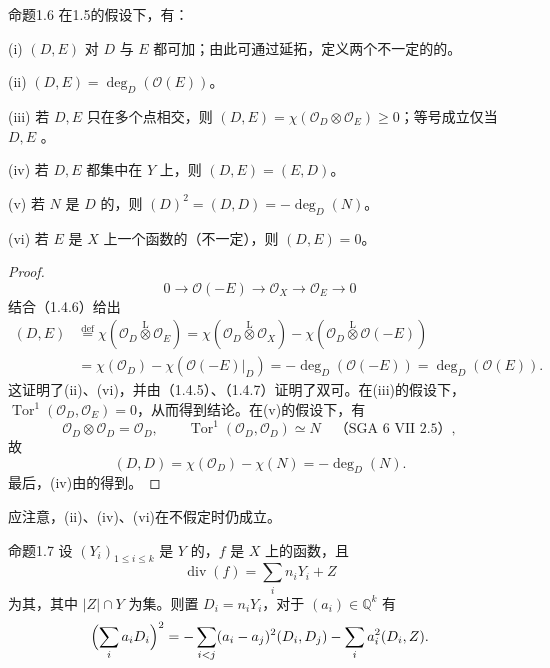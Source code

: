 \begin{SGAresult}{命题}{1.6}
在1.5的假设下，有：

(i)  $(D,E)$ 对 $D$ 与 $E$ 都可加；由此可通过延拓，定义两个不一定的的。

(ii) $(D,E)=\deg_D(\mathcal O(E))$。

(iii) 若 $D,E$ 只在多个点相交，则 $(D,E)=\chi(\mathcal O_D\otimes\mathcal O_E)\geq0$；等号成立仅当 $D,E$ 。

(iv) 若 $D,E$ 都集中在 $Y$ 上，则 $(D,E)=(E,D)$。

(v) 若 $N$ 是 $D$ 的，则 $(D)^2=(D,D)=-\deg_D(N)$。

(vi) 若 $E$ 是 $X$ 上一个函数的（不一定），则 $(D,E)=0$。
\end{SGAresult}
\begin{proof}
\[
0\longrightarrow\mathcal O(-E)\longrightarrow\mathcal O_X\longrightarrow\mathcal O_E\longrightarrow0
\]
结合（1.4.6）给出
\begin{align*}
(D,E)&\overset{\mathrm{def}}=\chi(\mathcal O_D\mathbin{\overset{\mathrm L}{\otimes}}\mathcal O_E)
=\chi(\mathcal O_D\mathbin{\overset{\mathrm L}{\otimes}}\mathcal O_X)-\chi(\mathcal O_D\mathbin{\overset{\mathrm L}{\otimes}}\mathcal O(-E))\\
&=\chi(\mathcal O_D)-\chi(\mathcal O(-E)|_D)
=-\deg_D(\mathcal O(-E))=\deg_D(\mathcal O(E)).
\end{align*}
这证明了(ii)、(vi)，并由（1.4.5）、（1.4.7）证明了双可。在(iii)的假设下，$\operatorname{Tor}^1(\mathcal O_D,\mathcal O_E)=0$，从而得到结论。在(v)的假设下，有
\[
\mathcal O_D\otimes\mathcal O_D=\mathcal O_D,
\qquad\operatorname{Tor}^1(\mathcal O_D,\mathcal O_D)\simeq N
\quad\text{（SGA 6 VII 2.5）},
\]
故
\[
(D,D)=\chi(\mathcal O_D)-\chi(N)=-\deg_D(N).
\]
最后，(iv)由的得到。
\end{proof}
应注意，(ii)、(iv)、(vi)在不假定时仍成立。
\begin{SGAresult}{命题}{1.7}
设 $(Y_i)_{1\leq i\leq k}$ 是 $Y$ 的，$f$ 是 $X$ 上的函数，且
\[
\operatorname{div}(f)=\sum_i n_iY_i+Z
\]
为其，其中 $|Z|\cap Y$ 为集。则置 $D_i=n_iY_i$，对于 $(a_i)\in\mathbb Q^k$ 有
\[
\Bigl(\sum_i a_iD_i\Bigr)^2
=-\sum_{i<j}(a_i-a_j)^2(D_i,D_j)-\sum_i a_i^2(D_i,Z).
\]
\end{SGAresult}

